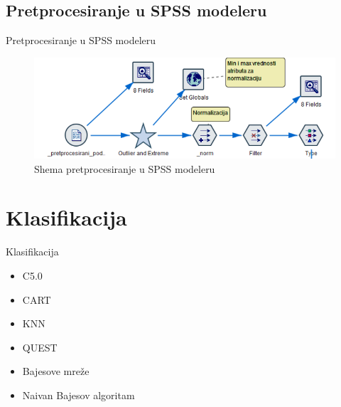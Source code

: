 \documentclass{beamer}
\begin{document}
\subsection{Pretprocesiranje u SPSS modeleru}
\begin{frame}{Pretprocesiranje u SPSS modeleru}
  			\begin{figure}[h!]
                \begin{center}
                \includegraphics[scale=0.60]{pretprocesiranje_SPSS.png}
                \end{center}
                \caption{Shema pretprocesiranje u SPSS modeleru}
                \label{fig:pretprocesiranje_spss}
             \end{figure}
\end{frame}
\section{Klasifikacija}
\begin{frame}{Klasifikacija}
    \begin{itemize}
        \item C5.0
        \item CART
        \item KNN
        \item QUEST
        \item Bajesove mreže
        \item Naivan Bajesov algoritam
    \end{itemize}
\end{frame}

\end{document}
